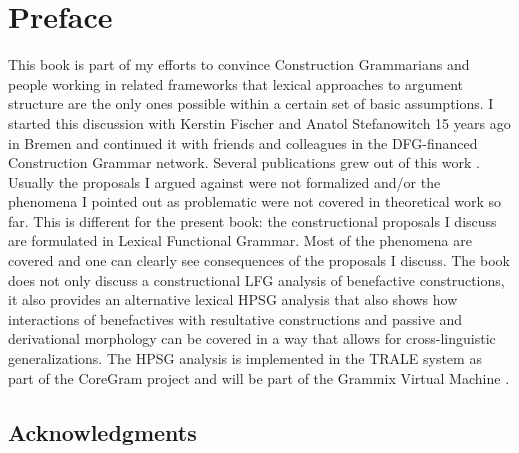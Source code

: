 




%




\frontmatter
\maketitle

\tableofcontents

%


\chapter{Preface}

This book is part of my efforts to convince Construction Grammarians and people working in related
frameworks that lexical approaches to argument structure are the only ones possible within a certain
set of basic assumptions. I started this discussion with Kerstin Fischer and Anatol Stefanowitch 15
years ago in Bremen and continued it with friends and colleagues in the DFG-financed Construction
Grammar network. Several publications grew out of this work
\citep{Mueller2006d,Mueller2007d,MuellerPersian,MWArgSt,MWArgStReply,MW2014a,MuellerSatztypen,MuellerDefaults}. Usually
the proposals I argued against were not formalized and/or the phenomena I pointed out as problematic
were not covered in theoretical work so far. This is different for the present book: the
constructional proposals I discuss are formulated in Lexical Functional Grammar. Most of the
phenomena are covered and one can clearly see consequences of the proposals I discuss. The book does
not only discuss a constructional LFG analysis of benefactive constructions, it also provides an
alternative lexical HPSG analysis that also shows how interactions of benefactives with resultative
constructions and passive and derivational morphology can be covered in a way that allows for
cross-linguistic generalizations. The HPSG analysis is implemented in the TRALE system
\citep*{MPR2002a-u,Penn2004a-u} as part of the CoreGram project \citep{MuellerCoreGram} and will be part of the Grammix Virtual Machine
\citep{MuellerGrammix}.

\section*{Acknowledgments}

